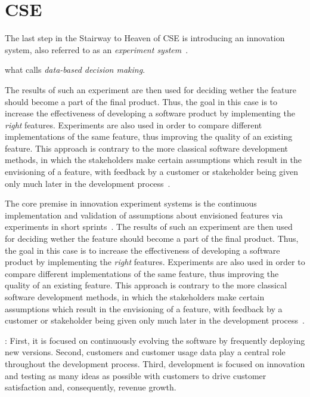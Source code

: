 \section{\acf{CSE}}
\label{sec:fundamentals:edsd}

The last step in the Stairway to Heaven of \ac{CSE} is introducing an innovation system, also referred to as an \emph{experiment system}~\cite{Olsson2012}.

\cite{Olsson2012}
\cite{Bosch2012}
 what \citet{Bosch2012} calls \emph{data-based decision making}.

The results of such an experiment are then used for deciding wether the feature should become a part of the final product.
Thus, the goal in this case is to increase the effectiveness of developing a software product by implementing the \emph{right} features.
Experiments are also used in order to compare different implementations of the same feature, thus improving the quality of an existing feature.
This approach is contrary to the more classical software development methods, in which the stakeholders make certain assumptions which result in the envisioning of a feature, with feedback by a customer or stakeholder being given only much later in the development process~\cite{Bosch2012}.

The core premise in innovation experiment systems is the continuous implementation and validation of assumptions about envisioned features via experiments in short sprints~\cite{Bosch2014}.
The results of such an experiment are then used for deciding wether the feature should become a part of the final product.
Thus, the goal in this case is to increase the effectiveness of developing a software product by implementing the \emph{right} features.
Experiments are also used in order to compare different implementations of the same feature, thus improving the quality of an existing feature.
This approach is contrary to the more classical software development methods, in which the stakeholders make certain assumptions which result in the envisioning of a feature, with feedback by a customer or stakeholder being given only much later in the development process~\cite{Bosch2012}.

\cite{Bosch2012}: First, it is focused on continuously evolving the software by frequently deploying new versions. Second, customers and customer usage data play a central role throughout the development process. Third, development is focused on innovation and testing as many ideas as possible with customers to drive customer satisfaction and, consequently, revenue growth.


